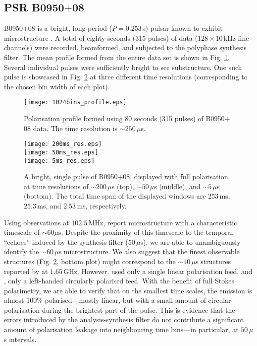 \documentclass{pasa}%
\newcommand{\psrslowB}{B0950$+$08}
\begin{document}

\subsection{PSR \psrslowB{}}

\psrslowB{} is a bright, long-period ($P = 0.253\,$s) pulsar known to exhibit microstructure \citep{Popov2002,Kuzmin2003}.
A total of eighty seconds (315 pulses) of data ($128 \times 10\,$kHz fine channels) were recorded, beamformed, and subjected to the polyphase synthesis filter.
The mean profile formed from the entire data set is shown in Fig. \ref{fig:0950_80_secs}.
Several individual pulses were sufficiently bright to see substructure.
One such pulse is showcased in Fig. \ref{fig:0950_single_pulse} at three different time resolutions (corresponding to the chosen bin width of each plot).

\begin{figure}[t!]
    \centering
    \texttt{[image: 1024bins\_profile.eps]}
    \caption{Polarisation profile formed using 80 seconds (315 pulses) of \psrslowB{} data. The time resolution is $\sim 250\,\mu$s.}
    \label{fig:0950_80_secs}
\end{figure}

\begin{figure}[t!]
    \centering
    \texttt{[image: 200ms\_res.eps]} \\[10pt]
    \texttt{[image: 50ms\_res.eps]} \\[10pt]
    \texttt{[image: 5ms\_res.eps]}
    \caption{A bright, single pulse of \psrslowB{}, displayed with full polarisation at time resolutions of $\sim 200\,\mu$s (top), $\sim 50\,\mu$s (middle), and $\sim 5\,\mu$s (bottom). The total time span of the displayed windows are $253\,$ms, $25.3\,$ms, and $2.53\,$ms, respectively.}
    \label{fig:0950_single_pulse}
\end{figure}

Using observations at $102.5\,$MHz, \citet{Kuzmin2003} report microstructure with a characteristic timescale of $\sim 60\mu$s.
Despite the proximity of this timescale to the temporal ``echoes'' induced by the synthesis filter ($50\,\mu$s), we are able to unambiguously identify the $\sim 60\,\mu$s microstructure.
We also suggest that the finest observable structures (Fig. \ref{fig:0950_single_pulse}, bottom plot) might correspond to the $\sim 10\,\mu$s structures reported by \citet{Popov2002} at $1.65\,$GHz.
However, \citet{Kuzmin2003} used only a single linear polarisation feed, and \citet{Popov2002}, only a left-handed circularly polarised feed.
With the benefit of full Stokes polarimetry, we are able to verify that on the smallest time scales, the emission is almost 100\% polarised---mostly linear, but with a small amount of circular polarisation during the brightest part of the pulse.
This is evidence that the errors introduced by the analysis-synthesis filter do not contribute a significant amount of polarisation leakage into neighbouring time bins---in particular, at $50\,\mu$s intervals.
\end{document}
